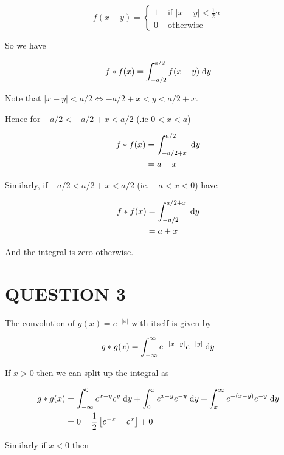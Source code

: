 \documentclass[a4paper]{article}
\begin{document}
\[ f(x-y) = \begin{cases} 1  & \text{ if } | x-y | < \frac{1}{2} a \\ 0 & \text{ otherwise } \end{cases} \]

So we have

\begin{align*}
f * f(x) & = \int_{-a/2}^{a/2}  f(x-y) \; \mathrm{d} y  \\
\end{align*}

Note that $ | x-y | < a/2 \iff -a/2 + x < y < a/2 + x $. 


Hence for $ -a/2 < -a/2 + x < a/2 $ (.ie $ 0 < x < a $)

\begin{align*}
f * f(x) & = \int_{-a/2 + x}^{a/2} \; \mathrm{d} y  \\
& = a - x
\end{align*}

Similarly, if $ -a/2 < a/2 + x < a/2 $ (ie. $ -a < x < 0 $) have 

\begin{align*}
f * f(x) & = \int_{-a/2}^{a/2+x} \; \mathrm{d} y  \\
& = a + x
\end{align*}

And the integral is zero otherwise. 




\section{QUESTION 3}


The convolution of $ g(x) = e^{-| x |} $ with itself is given by

\begin{align*}
g * g(x) & = \int_{-\infty}^{\infty} e^{-| x - y|} e^{-| y |} \; \mathrm{d} y  \\
\end{align*}

If $ x > 0 $ then we can split up the integral as 

\begin{align*}
g * g(x) & = \int_{-\infty}^{0} e^{x - y} e^{y} \; \mathrm{d} y + \int_{0}^{x} e^{x - y} e^{-y} \; \mathrm{d} y + \int_{x}^{\infty} e^{-(x - y)} e^{-y} \; \mathrm{d} y \\
& = 0 - \frac{1}{2} \left[  e^{-x} - e^{x} \right] + 0 
\end{align*}


Similarly if $ x < 0 $ then
\end{document}
